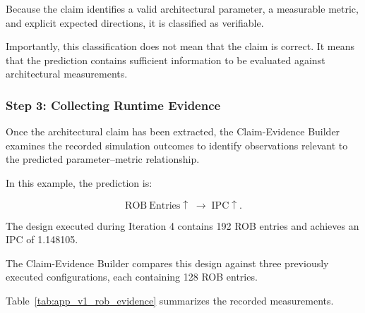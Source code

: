 Because the claim identifies a valid
architectural parameter, a measurable metric,
and explicit expected directions, it is
classified as verifiable.

Importantly, this classification does not
mean that the claim is correct. It means
that the prediction contains sufficient
information to be evaluated against
architectural measurements.



\subsubsection{Step 3: Collecting Runtime Evidence}

Once the architectural claim has been
extracted, the Claim-Evidence Builder
examines the recorded simulation outcomes
to identify observations relevant to
the predicted parameter--metric relationship.

In this example, the prediction is:

\begin{equation}
\mathrm{ROB\ Entries}\uparrow
\;\rightarrow\;
\mathrm{IPC}\uparrow.
\end{equation}

The design executed during Iteration 4
contains 192 ROB entries and achieves
an IPC of 1.148105.

The Claim-Evidence Builder compares this
design against three previously executed
configurations, each containing 128 ROB
entries.

Table~\ref{tab:app_v1_rob_evidence}
summarizes the recorded measurements.

\begin{table}[htbp]
\centering
\caption{Runtime evidence collected for the
ROB--IPC architectural prediction.}
\label{tab:app_v1_rob_evidence}
\renewcommand{\arraystretch}{1.15}
\small
\setlength{\tabcolsep}{4pt}
\end{table}

